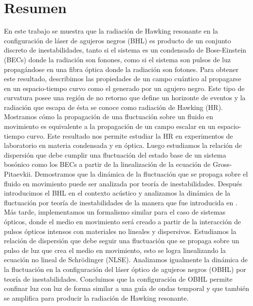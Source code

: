 \chapter*{Resumen}
En este trabajo se muestra que la radiaci\'{o}n de Hawking resonante en la configuraci\'{o}n de l\'{a}ser de agujeros negros (BHL) es producto de un conjunto discreto de inestabilidades, tanto si el sistema es un condensado de Bose-Einstein (BECs) donde la radiaci\'{o}n son fonones, como si el sistema son pulsos de luz propag\'{a}ndose en una fibra \'{o}ptica donde la radiaci\'{o}n son fotones. Para obtener este resultado, describimos las propiedades de un campo cu\'{a}ntico al propagarse en un espacio-tiempo curvo como el generado por un agujero negro. Este tipo de curvatura posee una regi\'{o}n de no retorno que define un horizonte de eventos y la radiaci\'{o}n que escapa de \'{e}sta se conoce como radiaci\'{o}n de Hawking (HR).\\

Mostramos c\'omo la propagaci\'{o}n de una fluctuaci\'{o}n sobre un fluido en movimiento es equivalente a la propagaci\'{o}n de un campo escalar en un espacio-tiempo curvo. Este resultado nos permite estudiar la HR en experimentos de laboratorio en materia condensada y en \'{o}ptica. Luego estudiamos la relaci\'{o}n de dispersi\'{o}n que debe cumplir una fluctuaci\'{o}n del estado base de un sistema bos\'{o}nico como los BECs a partir de la linealizaci\'{o}n de la ecuaci\'{o}n de Gross-Pitaevkii. Demostramos que la din\'{a}mica de la fluctuaci\'{o}n que se propaga sobre el fluido en movimiento puede ser analizada por teor\'{i}a de inestabilidades. Despu\'{e}s introducimos el BHL en el contexto ac\'{u}stico y analizamos la din\'{a}mica de la fluctuaci\'{o}n por teor\'{i}a de inestabilidades de la manera que fue introducida en \cite{2018Bermudez}.\\

M\'{a}s tarde, implementamos un formalismo similar para el caso de sistemas \'{o}pticos, donde el medio en movimiento ser\'{a} creado a partir de la interacci\'{o}n de pulsos \'{o}pticos intensos con materiales no lineales y dispersivos. Estudiamos la relaci\'{o}n de dispersi\'{o}n que debe seguir una fluctuaci\'{o}n que se propaga sobre un pulso de luz que crea el medio en movimiento, esto se logra linealizando la ecuaci\'{o}n no lineal de Schr\"{o}dinger (NLSE). Analizamos igualmente la din\'{a}mica de la fluctuaci\'{o}n en la configuraci\'{o}n del l\'{a}ser \'{o}ptico de agujeros negros (OBHL) por teor\'{i}a de inestabilidades. Concluimos que la configuraci\'{o}n de OBHL permite confinar luz con luz de forma similar a una gu\'{i}a de ondas temporal y que tambi\'{e}n se amplifica para producir la radiaci\'{o}n de Hawking resonante.